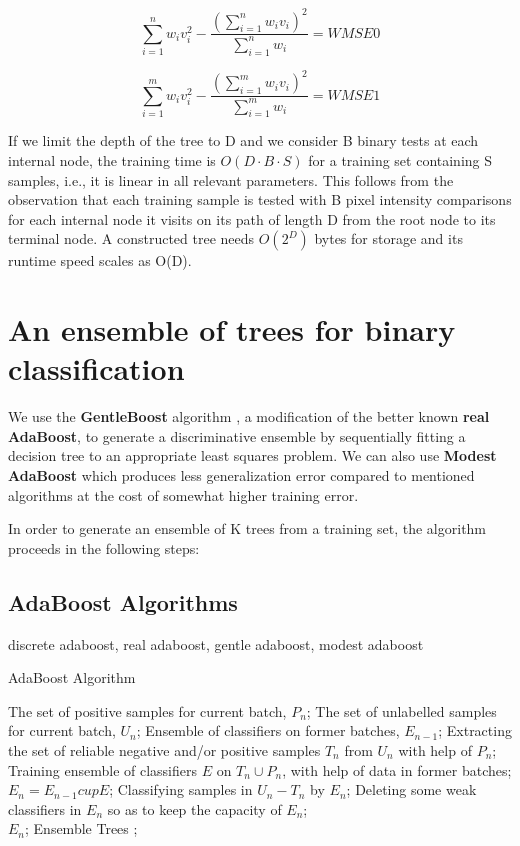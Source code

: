 \documentclass[a4paper,12pt]{article}
\begin{document}
\begin{equation}
\label{eq:WMSE00}
\sum_{i=1}^{n} w_i v_i^2 - \frac{(\sum_{i=1}^{n} w_i v_i)^2}
{\sum_{i=1}^{n}  w_i} = WMSE0
\end{equation}

\begin{equation}
\label{eq:WMSE1}
\sum_{i=1}^{m} w_i v_i^2 - \frac{(\sum_{i=1}^{m} w_i v_i)^2}
{\sum_{i=1}^{m}  w_i} = WMSE1
\end{equation}


If we limit the depth of the tree to D and we consider
B binary tests at each internal node, the training time is
$O(D \cdot B \cdot S)$ for a training set containing S samples, i.e., it
is linear in all relevant parameters. This follows from the
observation that each training sample is tested with B pixel
intensity comparisons for each internal node it visits on its
path of length D from the root node to its terminal node. A
constructed tree needs $O(2^D)$ bytes for storage and its runtime
speed scales as O(D).

\section{An ensemble of trees for binary classification}
We use the \textbf{GentleBoost} algorithm \cite{Friedman98additivelogistic}, a modification of the better known \textbf{real AdaBoost}, to generate a discriminative ensemble by sequentially fitting a decision tree to an appropriate least squares problem.
We can also use \textbf{Modest AdaBoost} which produces less generalization error compared to mentioned algorithms at the cost of somewhat higher training error. \cite{GML327}

In order to generate an ensemble of K trees from a training set, the algorithm proceeds in the
following steps:

\subsection{AdaBoost Algorithms}
discrete adaboost, real adaboost, gentle adaboost, modest adaboost

\begin{algorithm}[htb]
  \caption{ AdaBoost Algorithm}
  \label{alg:adaboost}
  \begin{algorithmic}[1]
    \Require
      The set of positive samples for current batch, $P_n$;
      The set of unlabelled samples for current batch, $U_n$;
      Ensemble of classifiers on former batches, $E_{n-1}$;
    \State Extracting the set of reliable negative and/or positive samples $T_n$ from $U_n$ with help of $P_n$;
    \label{code:fram:extract}
    \State Training ensemble of classifiers $E$ on $T_n \cup P_n$, with help of data in former batches;
    \label{code:fram:trainbase}
    \State $E_n=E_{n-1}cup E$;
    \label{code:fram:add}
    \State Classifying samples in $U_n-T_n$ by $E_n$;
    \label{code:fram:classify}
    \State Deleting some weak classifiers in $E_n$ so as to keep the capacity of $E_n$;
    \label{code:fram:select} \\
    \Return $E_n$;
    \Ensure
      Ensemble Trees ;
  \end{algorithmic}
\end{algorithm}
\end{document}
